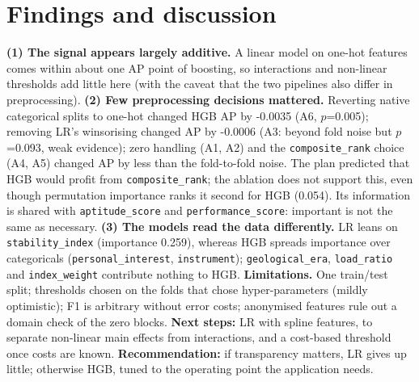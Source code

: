\documentclass[10pt]{article}
\begin{document}
\section{Findings and discussion}
\textbf{(1) The signal appears largely additive.} A linear model on one-hot features comes within about one AP point of boosting, so interactions and non-linear thresholds add little here (with the caveat that the two pipelines also differ in preprocessing). \textbf{(2) Few preprocessing decisions mattered.} Reverting native categorical splits to one-hot changed HGB AP by -0.0035 (A6, $p$=0.005); removing LR's winsorising changed AP by -0.0006 (A3: beyond fold noise but $p$=0.093, weak evidence); zero handling (A1, A2) and the \texttt{composite\_rank} choice (A4, A5) changed AP by less than the fold-to-fold noise. The plan predicted that HGB would profit from \texttt{composite\_rank}; the ablation does not support this, even though permutation importance ranks it second for HGB (0.054). Its information is shared with \texttt{aptitude\_score} and \texttt{performance\_score}: important is not the same as necessary. \textbf{(3) The models read the data differently.} LR leans on \texttt{stability\_index} (importance 0.259), whereas HGB spreads importance over categoricals (\texttt{personal\_interest}, \texttt{instrument}); \texttt{geological\_era}, \texttt{load\_ratio} and \texttt{index\_weight} contribute nothing to HGB.
\textbf{Limitations.} One train/test split; thresholds chosen on the folds that chose hyper-parameters (mildly optimistic); F1 is arbitrary without error costs; anonymised features rule out a domain check of the zero blocks. \textbf{Next steps:} LR with spline features, to separate non-linear main effects from interactions, and a cost-based threshold once costs are known. \textbf{Recommendation:} if transparency matters, LR gives up little; otherwise HGB, tuned to the operating point the application needs.

\FloatBarrier
\label{endofreport}
\clearpage
\end{document}
